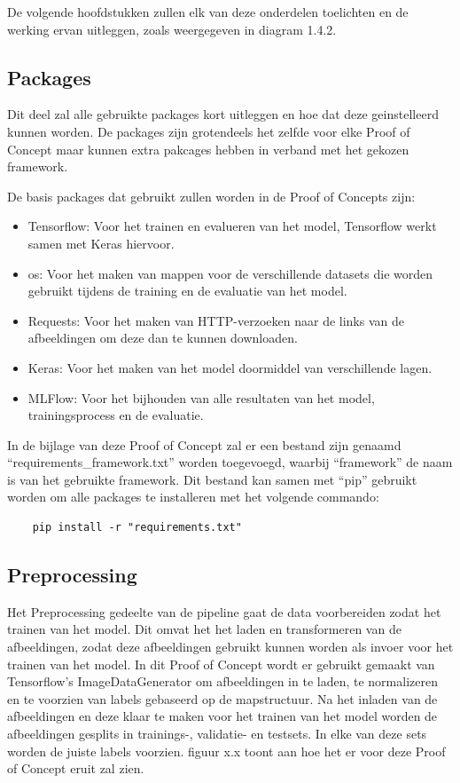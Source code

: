 De volgende hoofdstukken zullen elk van deze onderdelen toelichten en de werking ervan uitleggen, zoals weergegeven in diagram 1.4.2.
\subsection*{Packages}
Dit deel zal alle gebruikte packages kort uitleggen en hoe dat deze geinstelleerd kunnen worden. De packages zijn grotendeels het zelfde voor elke Proof of Concept maar kunnen extra pakcages hebben in verband met het gekozen framework.

De basis packages dat gebruikt zullen worden in de Proof of Concepts zijn:
\begin{itemize}
    \item Tensorflow: Voor het trainen en evalueren van het model, Tensorflow werkt samen met Keras hiervoor.
    \item os: Voor het maken van mappen voor de verschillende datasets die worden gebruikt tijdens de training en de evaluatie van het model.
    \item Requests: Voor het maken van HTTP-verzoeken naar de links van de afbeeldingen om deze dan te kunnen downloaden.
    \item Keras: Voor het maken van het model doormiddel van verschillende lagen.
    \item MLFlow: Voor het bijhouden van alle resultaten van het model, trainingsprocess en de evaluatie.
\end{itemize}

In de bijlage van deze Proof of Concept zal er een bestand zijn genaamd ``requirements\_framework.txt'' worden toegevoegd, waarbij ``framework'' de naam is van het gebruikte framework. Dit bestand kan samen met ``pip'' gebruikt worden om alle packages te installeren met het volgende commando:

\begin{verbatim}
    pip install -r "requirements.txt"
\end{verbatim}

\subsection{Preprocessing}
Het Preprocessing gedeelte van de pipeline gaat de data voorbereiden zodat het trainen van het model. Dit omvat het het laden en transformeren van de afbeeldingen, zodat deze afbeeldingen gebruikt kunnen worden als invoer voor het trainen van het model. In dit Proof of Concept wordt er gebruikt gemaakt van Tensorflow's ImageDataGenerator om afbeeldingen in te laden, te normalizeren en te voorzien van labels gebaseerd op de mapstructuur. Na het inladen van de afbeeldingen en deze klaar te maken voor het trainen van het model worden de afbeeldingen gesplits in trainings-, validatie- en testsets. In elke van deze sets worden de juiste labels voorzien. figuur x.x toont aan hoe het er voor deze Proof of Concept eruit zal zien. 
